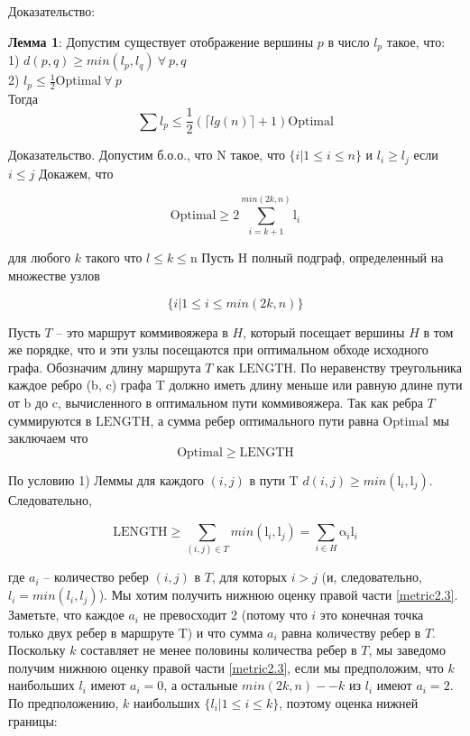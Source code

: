 \documentclass[a4paper, 14pt]{extarticle}
\numberwithin{equation}{section}
\begin{document}
Доказательство:

\textbf{Лемма 1}: Допустим существует отображение вершины $p$ в число $l_p$ такое, что:\\
1) $d(p,q) \geqslant min(l_p, l_q) \: \forall \: p,q$\\
2) $l_p \leqslant \frac{1}{2}\mathrm{Optimal}\: \forall \: p $\\
Тогда 
\begin{equation*}
\sum l_p \leqslant \frac{1}{2}(\lceil lg(n)\rceil+1)\mathrm{Optimal}
\end{equation*}

Доказательство.
Допустим б.о.о., что N такое, что  $\{i|1 \leqslant i \leqslant n \}$  и $l_i \geqslant l_j$ если $i \leqslant j$
Докажем, что 

\begin{equation}\label{metriclowerbound}
	{\mathrm{Optimal}} \geqslant 2\sum_{i=k+1}^{min(2k,n)}\mathrm{l}_i
\end{equation}

для любого $k$ такого что $l \leqslant k \leqslant $n
Пусть H полный подграф, определенный на множестве узлов

\begin{equation*}
	{\{i|1 \leqslant i \leqslant min(2k, n)\}}
\end{equation*}

Пусть $T$ -- это маршрут коммивояжера в $H$, который посещает вершины $H$ в том же порядке, что и эти узлы посещаются при оптимальном обходе исходного графа. Обозначим длину маршрута $T$ как $\mathrm{LENGTH}$. По неравенству треугольника каждое ребро (b, c) графа T должно иметь длину меньше или равную длине пути от b до c, вычисленного в оптимальном пути коммивояжера. Так как ребра $T$ суммируются в $\mathrm{LENGTH}$, а сумма ребер оптимального пути равна $\mathrm{Optimal}$ мы заключаем что
\begin{equation*}
	{\mathrm{Optimal}} \geqslant {\mathrm{LENGTH}}
\end{equation*}

По условию 1) Леммы для каждого $(i, j)$ в пути T  $d (i, j)\geqslant min (\mathrm{l}_i, \mathrm{l}_j)$. Следовательно,

\begin{equation}\label{metric2.3}
	{\mathrm{LENGTH}} \geqslant \sum_{(i,j)\in T}^{}min(\mathrm{l}_i,\mathrm{l}_j ) = \sum_{i\in H}^{} \mathrm{\alpha}_i\mathrm{l}_i
\end{equation}

где $a_i$ -- количество ребер $(i, j)$ в $T$, для которых $i > j$ (и, следовательно, $l_i=min(l_i, l_j)$).
Мы хотим получить нижнюю оценку правой части \eqref{metric2.3}. Заметьте, что каждое $a_i$ не превосходит 2 (потому что $i$ это конечная точка только двух ребер в маршруте T) и что сумма $a_i$ равна количеству ребер в $T$. Поскольку $k$ составляет не менее половины количества ребер в $T$, мы заведомо получим нижнюю оценку правой части \eqref{metric2.3}, если мы предположим, что $k$ наибольших $l_i$ имеют $a_i=0$, а остальные $min (2k, n) -- k$ из $l_i$ имеют $a_i= 2$. По предположению, $k$ наибольших $\{ l_i|1 \leqslant i \leqslant k\}$, поэтому оценка нижней границы:
\end{document}
